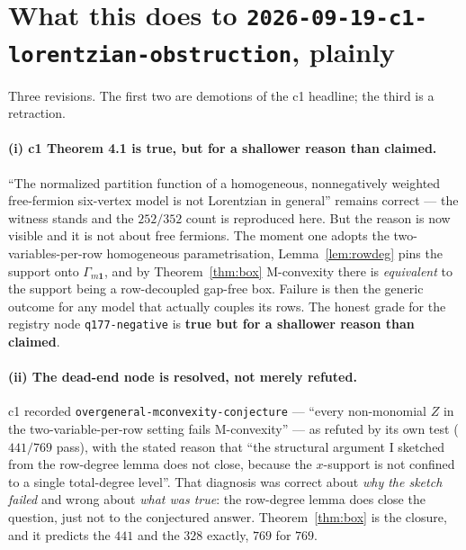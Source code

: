 \documentclass[11pt]{article}
\theoremstyle{definition}
\begin{document}
\section{What this does to \texttt{2026-09-19-c1-lorentzian-obstruction}, plainly}

Three revisions. The first two are demotions of the c1 headline; the third is a retraction.

\paragraph{(i) c1 Theorem 4.1 is true, but for a shallower reason than claimed.}
``The normalized partition function of a homogeneous, nonnegatively weighted free-fermion
six-vertex model is not Lorentzian in general'' remains correct --- the witness stands and
the $252/352$ count is reproduced here. But the reason is now visible and it is not about
free fermions. The moment one adopts the two-variables-per-row homogeneous parametrisation,
Lemma~\ref{lem:rowdeg} pins the support onto $\Gamma_{m\mathbf1}$, and by
Theorem~\ref{thm:box} M-convexity there is \emph{equivalent} to the support being a
row-decoupled gap-free box. Failure is then the generic outcome for any model that actually
couples its rows. The honest grade for the registry node \texttt{q177-negative} is
\textbf{true but for a shallower reason than claimed}.

\paragraph{(ii) The dead-end node is resolved, not merely refuted.}
c1 recorded \texttt{overgeneral-mconvexity-conjecture} --- ``every non-monomial $Z$ in the
two-variable-per-row setting fails M-convexity'' --- as refuted by its own test
($441/769$ pass), with the stated reason that ``the structural argument I sketched from the
row-degree lemma does not close, because the $x$-support is not confined to a single
total-degree level''. That diagnosis was correct about \emph{why the sketch failed} and
wrong about \emph{what was true}: the row-degree lemma does close the question, just not to
the conjectured answer. Theorem~\ref{thm:box} is the closure, and it predicts the $441$ and
the $328$ exactly, $769$ for $769$.
\end{document}

